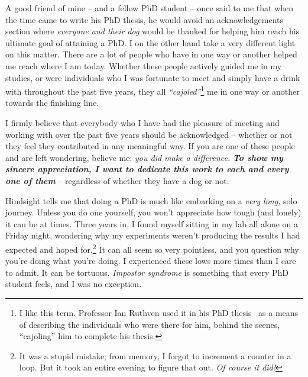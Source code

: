 

\begin{preamble}
{}

A good friend of mine -- and a fellow PhD student -- once said to me that when the time came to write his PhD thesis, he would avoid an acknowledgements section where \emph{everyone and their dog} would be thanked for helping him reach his ultimate goal of attaining a PhD. I on the other hand take a very different light on this matter. There are a lot of people who have in one way or another helped me reach where I am today. Whether these people actively guided me in my studies, or were individuals who I was fortunate to meet and simply have a drink with throughout the past five years, they all \emph{``cajoled''}\footnote{I like this term. Professor Ian Ruthven used it in his PhD thesis~\citep{ruthven2001phd} as a means of describing the individuals who were there for him, behind the scenes, ``cajoling'' him to complete his thesis.} me in one way or another towards the finishing line.

I firmly believe that everybody who I have had the pleasure of meeting and working with over the past five years should be acknowledged -- whether or not they feel they contributed in any meaningful way. If you are one of these people and are left wondering, believe me: \emph{you did make a difference.} \textbf{\emph{To show my sincere appreciation, I want to dedicate this work to each and every one of them}} -- regardless of whether they have a dog or not.

Hindsight tells me that doing a PhD is much like embarking on a \emph{very long,} solo journey. Unless you do one yourself, you won't appreciate how tough (and lonely) it can be at times. Three years in, I found myself sitting in my lab all alone on a Friday night, wondering why my experiments weren't producing the results I had expected and hoped for.\footnote{It was a stupid mistake; from memory, I forgot to increment a counter in a loop. But it took an entire evening to figure that out. \emph{Of course it did!}} It can all seem so very pointless, and you question why you're doing what you're doing. I experienced these lows more times than I care to admit. It can be tortuous. \emph{Impostor syndrome} is something that every PhD student feels, and I was no exception.


\end{preamble}
